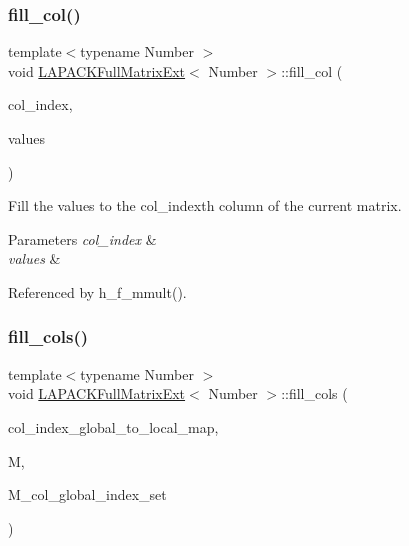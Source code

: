 \subsubsection{\texorpdfstring{fill\+\_\+col()}{fill\_col()}}
{\footnotesize\ttfamily template$<$typename Number $>$ \\
void \hyperlink{classLAPACKFullMatrixExt}{L\+A\+P\+A\+C\+K\+Full\+Matrix\+Ext}$<$ Number $>$\+::fill\+\_\+col (\begin{DoxyParamCaption}\item[{const \hyperlink{classLAPACKFullMatrixExt_a5cf5f4a6104dc17029210b5ca52bf574}{size\+\_\+type}}]{col\+\_\+index,  }\item[{const Vector$<$ Number $>$ \&}]{values }\end{DoxyParamCaption})}

Fill the {\ttfamily values} to the {\ttfamily col\+\_\+index\textquotesingle{}th} column of the current matrix. 
\begin{DoxyParams}{Parameters}
{\em col\+\_\+index} & \\
\hline
{\em values} & \\
\hline
\end{DoxyParams}


Referenced by h\+\_\+f\+\_\+mmult().

\mbox{\label{classLAPACKFullMatrixExt_ac1dcaa9fe085860f88c1034adb06f43e}} 
\subsubsection{\texorpdfstring{fill\+\_\+cols()}{fill\_cols()}}
{\footnotesize\ttfamily template$<$typename Number $>$ \\
void \hyperlink{classLAPACKFullMatrixExt}{L\+A\+P\+A\+C\+K\+Full\+Matrix\+Ext}$<$ Number $>$\+::fill\+\_\+cols (\begin{DoxyParamCaption}\item[{const std\+::map$<$ types\+::global\+\_\+dof\+\_\+index, size\+\_\+t $>$ \&}]{col\+\_\+index\+\_\+global\+\_\+to\+\_\+local\+\_\+map,  }\item[{const \hyperlink{classLAPACKFullMatrixExt}{L\+A\+P\+A\+C\+K\+Full\+Matrix\+Ext}$<$ Number $>$ \&}]{M,  }\item[{const std\+::vector$<$ types\+::global\+\_\+dof\+\_\+index $>$ \&}]{M\+\_\+col\+\_\+global\+\_\+index\+\_\+set }\end{DoxyParamCaption})}

